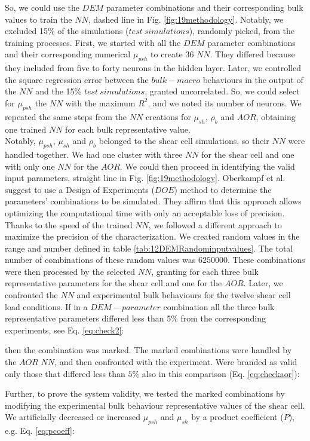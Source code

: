 So, we could use the $DEM$ parameter combinations and their corresponding bulk
values to train the $NN$,
dashed line in Fig. \ref{fig:19methodology}.
Notably, we excluded 15\% of the simulations ($test ~ simulations$),
randomly picked, from the training processes.
First, we started with all the $DEM$ parameter combinations and their corresponding numerical $\mu_{psh}$ to create 36 $NN$. 
They differed because they included from five to forty neurons in the hidden
layer.
Later, we controlled the square regression error between the $bulk-macro$ behaviours in the output of 
the $NN$ and the 15\% $test ~ simulations$, granted uncorrelated. 
So, we could select for $\mu_{psh}$ the $NN$ with the maximum $R^2$, and we noted its number of neurons. 
We repeated the same steps from the $NN$ creations for $\mu_{sh}$, $\rho_b$ and $AOR$, 
obtaining one trained $NN$ for each bulk representative value. \\
Notably, $\mu_{psh}$, $\mu_{sh}$ and $\rho_b$ belonged to the shear cell
simulations, so their $NN$ were handled together. 
We had one cluster with three $NN$ for the shear cell and one with only one $NN$
for the $AOR$.
We could then proceed in identifying the valid input parameters, straight line
in Fig. \ref{fig:19methodology}.
Oberkampf et al. \cite{RefWorks:160} suggest to use a Design of Experiments
($DOE$) method to determine the parameters' combinations to be simulated.
They affirm that this approach allows optimizing the computational time with
only an acceptable loss of precision.
Thanks to the speed of the trained $NN$, we followed a different approach to
maximize the precision of the characterization.
We created random values
in the range and number defined in table \ref{tab:12DEMRandominputvalues}.
The total number of combinations of these random values was $6250000$. These
combinations were then processed by the selected $NN$, granting for each three bulk representative parameters for the shear cell and one for the $AOR$. 
Later, we confronted the $NN$ and experimental bulk behaviours for the twelve shear cell load conditions. 
If in a $DEM-parameter$ combination all the three bulk representative parameters differed less 
than 5\% from the corresponding experiments, see Eq. \ref{eq:check2}:

then the combination was marked. The marked combinations were handled by the
$AOR$ $NN$, and then confronted with the experiment.
Were branded as valid only those that differed less than $5\%$ also in this
comparison (Eq. \ref{eq:checkaor}):

Further, to prove the system validity, we tested the marked combinations by
modifying the experimental bulk behaviour representative values of the shear cell. 
We artificially decreased or increased $\mu_{psh}$ and $\mu_{sh}$ by a product
coefficient ($P$), e.g. Eq. \ref{eq:pcoeff}:




